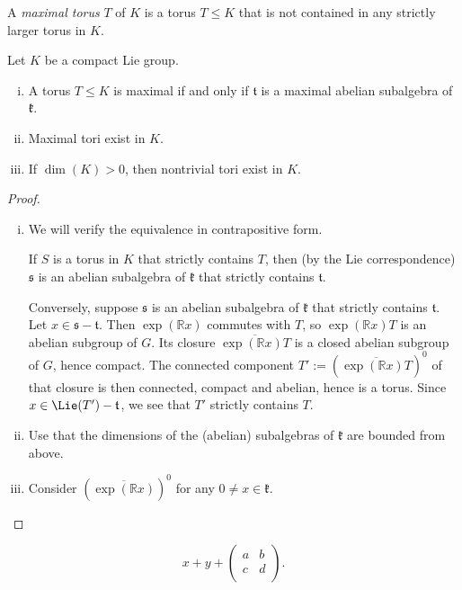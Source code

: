 \documentclass[reqno]{amsart} 
\begin{document}
\begin{definition}
  A \emph{maximal torus} $T$ of $K$ is a torus $T \leq K$ that is not contained in any strictly larger torus in $K$.
\end{definition}

\begin{lemma}\label{lem:maximal-tori-vs-maxl-ab-subalg}
  Let $K$ be a compact Lie group.
  \begin{enumerate}
[(i)]
  \item A torus $T \leq K$ is maximal if and only if $\mathfrak{t}$ is a maximal abelian subalgebra of $\mathfrak{k}$.
  \item Maximal tori exist in $K$.
  \item If $\dim(K) > 0$, then nontrivial tori exist in $K$. \label{item:existence-nontrivial-tori}
  \end{enumerate}
\end{lemma}
\begin{proof}
  \begin{enumerate}
[(i)]
  \item We will verify the equivalence in contrapositive form.
    
    If $S$ is a torus in $K$ that strictly contains $T$, then (by the Lie correspondence) $\mathfrak{s}$ is an abelian subalgebra of $\mathfrak{k}$ that strictly contains $\mathfrak{t}$.

    Conversely, suppose $\mathfrak{s}$ is an abelian subalgebra of $\mathfrak{k}$ that strictly contains $\mathfrak{t}$.  Let $x \in \mathfrak{s} - \mathfrak{t}$.  Then $\exp(\mathbb{R} x)$ commutes with $T$, so $\exp(\mathbb{R} x) T$ is an abelian subgroup of $G$.  Its closure $\overline{\exp(\mathbb{R} x) T}$ is a closed abelian subgroup of $G$, hence compact.  The connected component $T' := (\overline{\exp(\mathbb{R} x) T})^0$ of that closure is then connected, compact and abelian, hence is a torus.  Since $x \in \Lie(T') - \mathfrak{t}$, we see that $T'$ strictly contains $T$.
  \item Use that the dimensions of the (abelian) subalgebras of $\mathfrak{k}$ are bounded from above.
  \item Consider $(\overline{\exp(\mathbb{R} x)})^0$ for any $0 \neq x \in \mathfrak{k}$.
  \end{enumerate}
\end{proof}

\begin{equation*}
  x + y +
  \begin{pmatrix}
    a    & b \\
    c         & d \\
  \end{pmatrix}.
\end{equation*}
\end{document}
